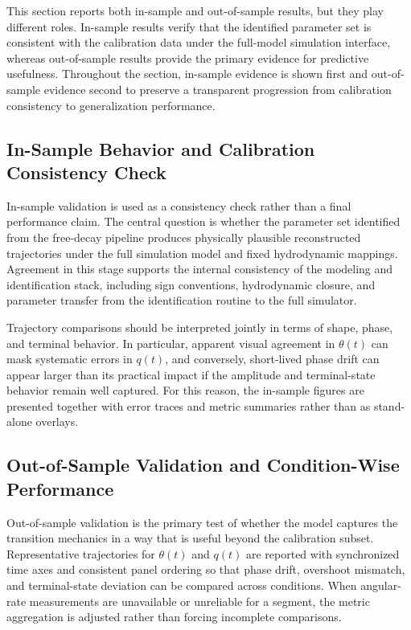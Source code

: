 This section reports both in-sample and out-of-sample results, but they play different roles. In-sample results verify that the identified parameter set is consistent with the calibration data under the full-model simulation interface, whereas out-of-sample results provide the primary evidence for predictive usefulness. Throughout the section, in-sample evidence is shown first and out-of-sample evidence second to preserve a transparent progression from calibration consistency to generalization performance.

\subsection{In-Sample Behavior and Calibration Consistency Check}

In-sample validation is used as a consistency check rather than a final performance claim. The central question is whether the parameter set identified from the free-decay pipeline produces physically plausible reconstructed trajectories under the full simulation model and fixed hydrodynamic mappings. Agreement in this stage supports the internal consistency of the modeling and identification stack, including sign conventions, hydrodynamic closure, and parameter transfer from the identification routine to the full simulator.

Trajectory comparisons should be interpreted jointly in terms of shape, phase, and terminal behavior. In particular, apparent visual agreement in $\theta(t)$ can mask systematic errors in $q(t)$, and conversely, short-lived phase drift can appear larger than its practical impact if the amplitude and terminal-state behavior remain well captured. For this reason, the in-sample figures are presented together with error traces and metric summaries rather than as stand-alone overlays.

\subsection{Out-of-Sample Validation and Condition-Wise Performance}

Out-of-sample validation is the primary test of whether the model captures the transition mechanics in a way that is useful beyond the calibration subset. Representative trajectories for $\theta(t)$ and $q(t)$ are reported with synchronized time axes and consistent panel ordering so that phase drift, overshoot mismatch, and terminal-state deviation can be compared across conditions. When angular-rate measurements are unavailable or unreliable for a segment, the metric aggregation is adjusted rather than forcing incomplete comparisons.

